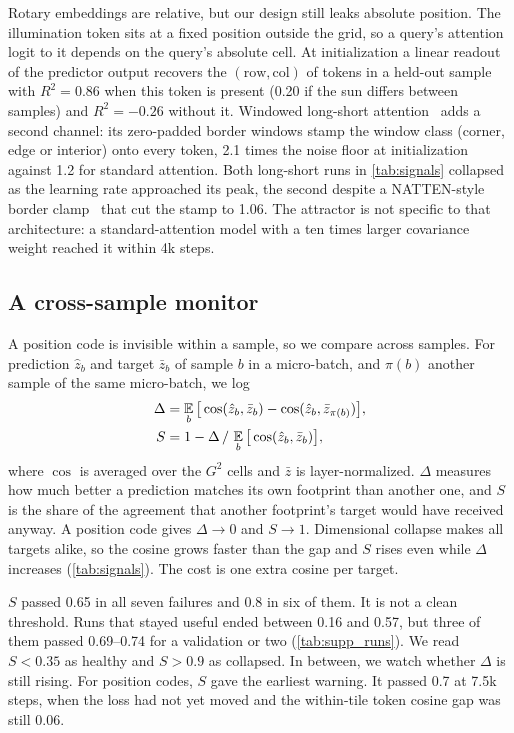 Rotary embeddings are relative, but our design still leaks absolute position. The illumination token sits at a fixed position outside the grid, so a query's attention logit to it depends on the query's absolute cell. At initialization a linear readout of the predictor output recovers the $(\text{row}, \text{col})$ of tokens in a held-out sample with $R^2{=}0.86$ when this token is present (0.20 if the sun differs between samples) and $R^2{=}{-}0.26$ without it. Windowed long-short attention~\cite{zhu2021long} adds a second channel: its zero-padded border windows stamp the window class (corner, edge or interior) onto every token, 2.1 times the noise floor at initialization against 1.2 for standard attention. Both long-short runs in \cref{tab:signals} collapsed as the learning rate approached its peak, the second despite a NATTEN-style border clamp~\cite{hassani2023neighborhood} that cut the stamp to 1.06. The attractor is not specific to that architecture: a standard-attention model with a ten times larger covariance weight reached it within 4k steps.

\subsection{A cross-sample monitor}
\label{sec:monitor}

A position code is invisible within a sample, so we compare across samples. For prediction $\hat z_b$ and target $\bar z_b$ of sample $b$ in a micro-batch, and $\pi(b)$ another sample of the same micro-batch, we log
\begin{align}
  \Delta &= \operatorname*{\mathbb{E}}_b\big[\cos(\hat z_b, \bar z_b) - \cos(\hat z_b, \bar z_{\pi(b)})\big], \label{eq:gap}\\
  S &= 1 - \Delta \,/\, \operatorname*{\mathbb{E}}_b\big[\cos(\hat z_b, \bar z_b)\big], \label{eq:share}
\end{align}
where $\cos$ is averaged over the $G^2$ cells and $\bar z$ is layer-normalized. $\Delta$ measures how much better a prediction matches its own footprint than another one, and $S$ is the share of the agreement that another footprint's target would have received anyway. A position code gives $\Delta\to0$ and $S\to1$. Dimensional collapse makes all targets alike, so the cosine grows faster than the gap and $S$ rises even while $\Delta$ increases (\cref{tab:signals}). The cost is one extra cosine per target.

$S$ passed 0.65 in all seven failures and 0.8 in six of them. It is not a clean threshold. Runs that stayed useful ended between 0.16 and 0.57, but three of them passed 0.69--0.74 for a validation or two (\cref{tab:supp_runs}). We read $S{<}0.35$ as healthy and $S{>}0.9$ as collapsed. In between, we watch whether $\Delta$ is still rising. For position codes, $S$ gave the earliest warning. It passed 0.7 at 7.5k steps, when the loss had not yet moved and the within-tile token cosine gap was still 0.06.

